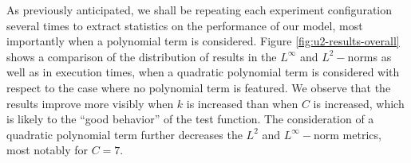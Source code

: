 \documentclass[12pt]{report} %
\begin{document}
As previously anticipated, we shall be repeating each experiment configuration several times to extract statistics on the performance of our model, most importantly when a polynomial term is considered. Figure \ref{fig:u2-results-overall} shows a comparison of the distribution of results in the $L^\infty$ and $L^2-$norms as well as in execution times, when a quadratic polynomial term is considered with respect to the case where no polynomial term is featured. We observe that the results improve more visibly when $k$ is increased than when $C$ is increased, which is likely to the ``good behavior'' of the test function. The consideration of a quadratic polynomial term further decreases the $L^2$ and $L^\infty-$norm metrics, most notably for $C=7$.

\clearpage
\begin{figure}
  \hspace*{-1cm}
  \begin{tabular}{cccccc}

\end{tabular}
\end{figure}
\end{document}
